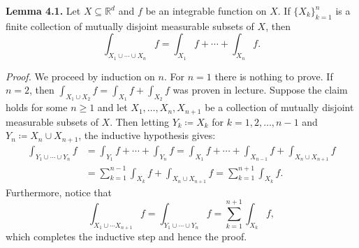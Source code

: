 \noindent \textbf{Lemma 4.1.} Let \( X \subseteq \mathbb{R}^{d}  \) and \( f \) be an integrable function on \( X \). If \( \{ X_{k}  \}_{k = 1}^{n}   \) is a finite collection of mutually disjoint measurable subsets of \( X \), then \[\int_{X_1 \cup \cdots \cup  X_{n} } f = \int_{X_1} f + \cdots + \int_{X_{n} } f. \]

\noindent \emph{Proof.} We proceed by induction on \( n \). For \( n = 1 \) there is nothing to prove. If \( n = 2 \), then \( \int_{X_1 \cup X_2} f = \int_{X_1} f + \int_{X_{2} } f \) was proven in lecture. Suppose the claim holds for some \( n \geq 1 \) and let \( X_1, \hdots , X_{n}  , X_{n+1} \) be a collection of mutually disjoint measurable subsets of \( X \). Then letting \( Y_{k} \coloneqq X_{k}   \) for \( k = 1, 2, \hdots , n - 1 \) and \( Y_{n} \coloneqq X_{n} \cup X_{n+1}    \), the inductive hypothesis gives:
\begin{align*}
	\int_{Y_1 \cup \cdots \cup Y_{n} } f  &= \int_{Y_1} f + \cdots + \int_{Y_{n} } f = \int_{X_1} f + \cdots + \int_{X_{n-1} } f  + \int_{X_{n } \cup X_{n+1}} f \\
					      &= \sum_{k=1}^{n-1} \int_{X_{k} } f + \int_{X_{n} \cup X_{n+1} } f = \sum_{k=1}^{n+1}\int_{X_{k} } f \tag{by disjointness and case \( n = 2 \)}.
\end{align*}
Furthermore, notice that \[\int_{X_1 \cup \cdots X_{n+1} } f = \int_{Y_1 \cup \cdots \cup Y_{n} }f = \sum_{k=1}^{n+1}\int_{X_{k} } f, \] which completes the inductive step and hence the proof.

